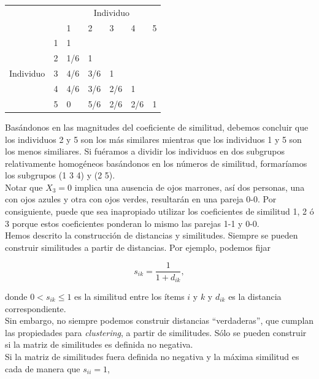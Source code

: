 \documentclass[a4paper, 20pt]{article}
\begin{document}
\begin{table}[H]
\centering
\resizebox{7.5cm}{!} {
\begin{tabular}{lllllll}
\multicolumn{2}{l}{\multirow{2}{*}{}}               & \multicolumn{5}{c}{Individuo}                  \\
\multicolumn{2}{l}{}                                & 1   & 2   & 3   & 4   & 5                      \\ \cline{3-3} \cline{7-7} 
\multirow{5}{*}{Individuo} & \multicolumn{1}{l|}{1} & 1   &     &     &     & \multicolumn{1}{l|}{}  \\
                           & \multicolumn{1}{l|}{2} & 1/6 & 1   &     &     & \multicolumn{1}{l|}{}  \\
                           & \multicolumn{1}{l|}{3} & 4/6 & 3/6 & 1   &     & \multicolumn{1}{l|}{}  \\
                           & \multicolumn{1}{l|}{4} & 4/6 & 3/6 & 2/6 & 1   & \multicolumn{1}{l|}{}  \\
                           & \multicolumn{1}{l|}{5} & 0   & 5/6 & 2/6 & 2/6 & \multicolumn{1}{l|}{1} \\ \cline{3-3} \cline{7-7} 
\end{tabular}
}
\end{table}

Basándonos en las magnitudes del coeficiente de similitud, debemos concluir que los individuos 2 y 5 son los más similares mientras que los individuos 1 y 5 son los menos similiares. Si fuéramos a dividir los individuos en dos subgrupos relativamente homogéneos basándonos en los números de similitud, formaríamos los subgrupos (1 3 4) y (2 5).\\
Notar que $X_3=0$ implica una ausencia de ojos marrones, así dos personas, una con ojos azules y otra con ojos verdes, resultarán en una pareja 0-0. Por consiguiente, puede que sea inapropiado utilizar los coeficientes de similitud 1, 2 ó 3 porque estos coeficientes ponderan lo mismo las parejas 1-1 y 0-0.\\

Hemos descrito la construcción de distancias y similitudes. Siempre se pueden construir similitudes a partir de distancias. Por ejemplo, podemos fijar

$$ s_{ik} = \frac{1}{1+d_{ik}},$$ 

donde $0<s_{ik}\leq 1$ es la similitud entre los ítems $i$ y $k$ y $d_{ik}$ es la distancia correspondiente.\\
Sin embargo, no siempre podemos construir distancias ``verdaderas'', que cumplan las propiedades para \textit{clustering}, a partir de similitudes. Sólo se pueden construir si la matriz de similitudes es definida no negativa.\\
Si la matriz de similitudes fuera definida no negativa y la máxima similitud es cada de manera que $s_{ii}=1$,
\end{document}
